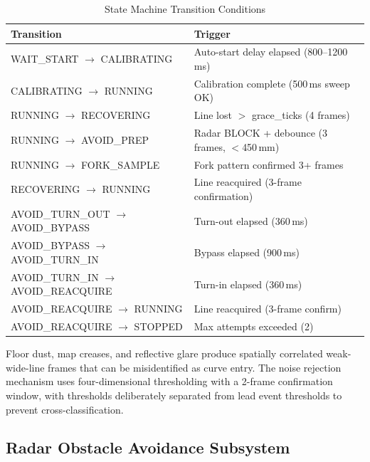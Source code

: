 \documentclass[letterpaper,journal]{IEEEtran}
\begin{document}
\begin{table}[!t]
    \caption{State Machine Transition Conditions}
    \label{tab:transitions}
    \centering
    \footnotesize
    \renewcommand{\arraystretch}{1.3}
    \begin{tabular}{@{}>{\raggedright\arraybackslash}p{}>{\raggedright\arraybackslash}p{}@{}}
        \toprule
        \textbf{Transition} & \textbf{Trigger} \\
        \midrule
        WAIT\_START \;$\rightarrow$\; CALIBRATING    & Auto-start delay elapsed (800--1200\,ms) \\
        CALIBRATING \;$\rightarrow$\; RUNNING        & Calibration complete (500\,ms sweep OK) \\
        RUNNING \;$\rightarrow$\; RECOVERING         & Line lost $>$ grace\_ticks (4 frames) \\
        RUNNING \;$\rightarrow$\; AVOID\_PREP        & Radar BLOCK + debounce (3 frames, $<$450\,mm) \\
        RUNNING \;$\rightarrow$\; FORK\_SAMPLE       & Fork pattern confirmed 3+ frames \\
        RECOVERING \;$\rightarrow$\; RUNNING          & Line reacquired (3-frame confirmation) \\
        AVOID\_TURN\_OUT \;$\rightarrow$\; AVOID\_BYPASS   & Turn-out elapsed (360\,ms) \\
        AVOID\_BYPASS \;$\rightarrow$\; AVOID\_TURN\_IN    & Bypass elapsed (900\,ms) \\
        AVOID\_TURN\_IN \;$\rightarrow$\; AVOID\_REACQUIRE & Turn-in elapsed (360\,ms) \\
        AVOID\_REACQUIRE \;$\rightarrow$\; RUNNING        & Line reacquired (3-frame confirm) \\
        AVOID\_REACQUIRE \;$\rightarrow$\; STOPPED        & Max attempts exceeded (2) \\
        \bottomrule
    \end{tabular}
\end{table}

Floor dust, map creases, and reflective glare produce spatially correlated weak-wide-line frames that can be misidentified as curve entry. The noise rejection mechanism uses four-dimensional thresholding with a 2-frame confirmation window, with thresholds deliberately separated from lead event thresholds to prevent cross-classification.

\subsection{Radar Obstacle Avoidance Subsystem}
\end{document}
